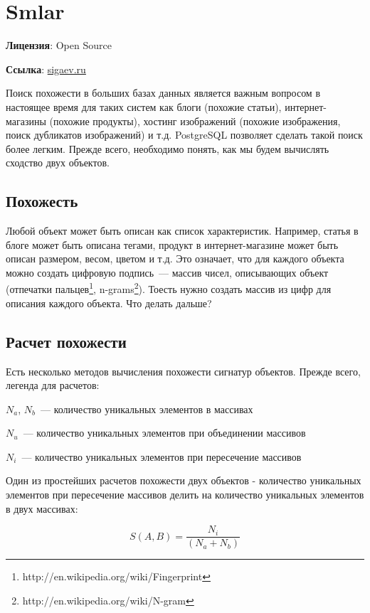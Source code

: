 \section{Smlar}
\textbf{Лицензия}: Open Source

\textbf{Ссылка}: \href{http://sigaev.ru/git/gitweb.cgi?p=smlar.git;a=blob;hb=HEAD;f=README}{sigaev.ru}

Поиск похожести в больших базах данных является важным вопросом в настоящее время для таких систем как блоги (похожие статьи), интернет-магазины (похожие продукты), хостинг изображений (похожие изображения, поиск дубликатов изображений) и т.д. PostgreSQL позволяет сделать такой поиск более легким. Прежде всего, необходимо понять, как мы будем вычислять сходство двух объектов.

\subsection{Похожесть}

Любой объект может быть описан как список характеристик. Например, статья в блоге может быть описана тегами, продукт в интернет-магазине может быть описан размером, весом, цветом и т.д. Это означает, что для каждого объекта можно создать цифровую подпись~--- массив чисел, описывающих объект (отпечатки пальцев\footnote{http://en.wikipedia.org/wiki/Fingerprint}, n-grams\footnote{http://en.wikipedia.org/wiki/N-gram}). Тоесть нужно создать массив из цифр для описания каждого объекта. Что делать дальше?

\subsection{Расчет похожести}

Есть несколько методов вычисления похожести сигнатур объектов. Прежде всего, легенда для расчетов:

$N_a$, $N_b$~--- количество уникальных элементов в массивах

$N_u$~--- количество уникальных элементов при объединении массивов

$N_i$~--- количество уникальных элементов при пересечение массивов

Один из простейших расчетов похожести двух объектов - количество уникальных элементов при пересечение массивов делить на количество уникальных элементов в двух массивах:

\begin{equation}
 \label{eq:smlar1}
 S(A,B) = \frac{N_{i}}{(N_{a}+N_{b})}
\end{equation}

